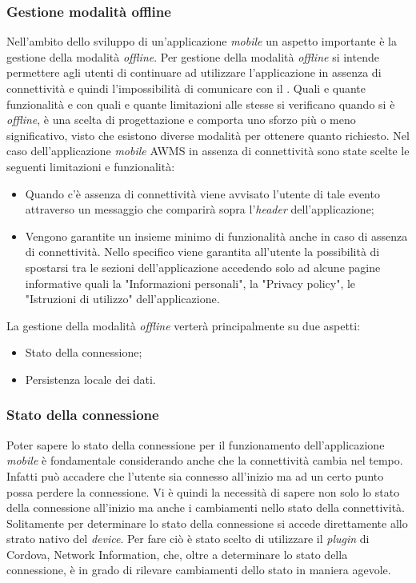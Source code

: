 \subsubsection{Gestione modalità offline}	
Nell'ambito dello sviluppo di un'applicazione \emph{mobile} un aspetto importante è la gestione della modalità \emph{offline}. Per gestione della modalità \emph{offline} si intende permettere agli utenti di continuare ad utilizzare l'applicazione in assenza di connettività e quindi l'impossibilità di comunicare con il . Quali e quante funzionalità e con quali e quante limitazioni alle stesse si verificano quando si è \emph{offline}, è una scelta di progettazione e comporta uno sforzo più o meno significativo, visto che esistono diverse modalità per ottenere quanto richiesto. Nel caso dell'applicazione \emph{mobile} \gls{AWMS} in assenza di connettività sono state scelte le seguenti limitazioni e funzionalità:
\begin{itemize}
	\item Quando c'è assenza di connettività viene avvisato l'utente di tale evento attraverso un messaggio che comparirà sopra l'\emph{header} dell'applicazione;
	\item Vengono garantite un insieme minimo di funzionalità anche in caso di assenza di connettività. Nello specifico viene garantita all'utente la possibilità di spostarsi tra le sezioni dell'applicazione accedendo solo ad alcune pagine informative quali la "Informazioni personali", la "Privacy policy", le "Istruzioni di utilizzo" dell'applicazione.
\end{itemize}

La gestione della modalità \emph{offline} verterà principalmente su due aspetti:
\begin{itemize}
	\item Stato della connessione;
	\item Persistenza locale dei dati.
\end{itemize}
\subsubsection{Stato della connessione}
Poter sapere lo stato della connessione per il funzionamento dell'applicazione \emph{mobile} è fondamentale considerando anche che la connettività cambia nel tempo. Infatti può accadere che l'utente sia connesso all'inizio ma ad un certo punto possa perdere la connessione. Vi è quindi la necessità di sapere non solo lo stato della connessione all'inizio ma anche i cambiamenti nello stato della connettività. Solitamente per determinare lo stato della connessione si accede direttamente allo strato nativo del \emph{device}. Per fare ciò è stato scelto di utilizzare il \emph{plugin} di Cordova, Network Information, che, oltre a determinare lo stato della connessione, è in grado di rilevare cambiamenti dello stato in maniera agevole.

